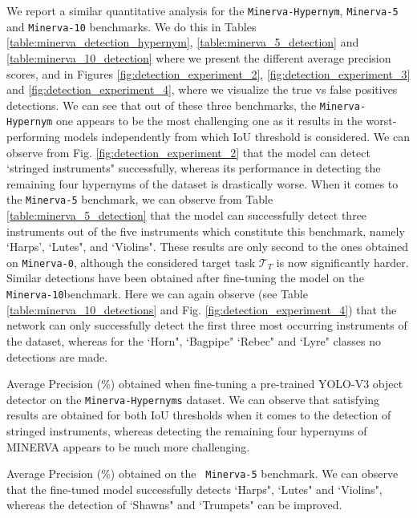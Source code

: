 We report a similar quantitative analysis for the \texttt{Minerva-Hypernym}, \texttt{Minerva-5} and \texttt{Minerva-10} benchmarks. We do this in Tables \ref{table:minerva_detection_hypernym}, \ref{table:minerva_5_detection} and \ref{table:minerva_10_detection} where we present the different average precision scores, and in Figures \ref{fig:detection_experiment_2}, \ref{fig:detection_experiment_3} and \ref{fig:detection_experiment_4}, where we visualize the true vs false positives detections. We can see that out of these three benchmarks, the \texttt{Minerva-Hypernym} one appears to be the most challenging one as it results in the worst-performing models independently from which IoU threshold is considered. We can observe from Fig. \ref{fig:detection_experiment_2} that the model can detect `stringed instruments" successfully, whereas its performance in detecting the remaining four hypernyms of the dataset is drastically worse. When it comes to the \texttt{Minerva-5} benchmark, we can observe from Table \ref{table:minerva_5_detection} that the model can successfully detect three instruments out of the five instruments which constitute this benchmark, namely `Harps', `Lutes", and `Violins". These results are only second to the ones obtained on \texttt{Minerva-0}, although the considered target task $\mathcal{T}_T$ is now significantly harder. Similar detections have been obtained after fine-tuning the model on the \texttt{Minerva-10}benchmark. Here we can again observe (see Table \ref{table:minerva_10_detections} and Fig. \ref{fig:detection_experiment_4}) that the network can only successfully detect the first three most occurring instruments of the dataset, whereas for the `Horn", `Bagpipe" `Rebec" and `Lyre" classes no detections are made. 

\begin{table}[ht!]
	\caption{Average Precision ($\%$) obtained when fine-tuning a pre-trained YOLO-V3 object detector on the \texttt{Minerva-Hypernyms} dataset. We can observe that satisfying results are obtained for both IoU thresholds when it comes to the detection of stringed instruments, whereas detecting the remaining four hypernyms of MINERVA appears to be much more challenging.}
\resizebox{\columnwidth}{!}{%
}
\label{table:minerva_detection_hypernyms}
\end{table}


\begin{table}[ht!]
	\caption{Average Precision ($\%$) obtained on the \texttt{ Minerva-5} benchmark. We can observe that the fine-tuned model successfully detects `Harps", `Lutes" and `Violins", whereas the detection of `Shawns" and `Trumpets" can be improved.}
\resizebox{\columnwidth}{!}{%
}
\label{table:minerva_5_detection}
\end{table}


